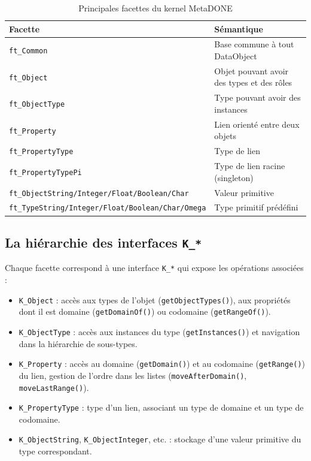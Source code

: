 \begin{table}[h]
\centering
\begin{tabular}{ll}
\hline
\textbf{Facette} & \textbf{Sémantique} \\
\hline
\texttt{ft\_Common} & Base commune à tout DataObject \\
\texttt{ft\_Object} & Objet pouvant avoir des types et des rôles \\
\texttt{ft\_ObjectType} & Type pouvant avoir des instances \\
\texttt{ft\_Property} & Lien orienté entre deux objets \\
\texttt{ft\_PropertyType} & Type de lien \\
\texttt{ft\_PropertyTypePi} & Type de lien racine (singleton) \\
\texttt{ft\_ObjectString/Integer/Float/Boolean/Char} & Valeur primitive \\
\texttt{ft\_TypeString/Integer/Float/Boolean/Char/Omega} & Type primitif prédéfini \\
\hline
\end{tabular}
\caption{Principales facettes du kernel MetaDONE}
\label{tab:facettypes}
\end{table}

\subsection{La hiérarchie des interfaces \texttt{K\_*}}

Chaque facette correspond à une interface \texttt{K\_*} qui expose les
opérations associées :

\begin{itemize}
    \item \texttt{K\_Object} : accès aux types de l'objet
    (\texttt{getObjectTypes()}), aux propriétés dont il est domaine
    (\texttt{getDomainOf()}) ou codomaine (\texttt{getRangeOf()}).
    \item \texttt{K\_ObjectType} : accès aux instances du type
    (\texttt{getInstances()}) et navigation dans la hiérarchie de
    sous-types.
    \item \texttt{K\_Property} : accès au domaine (\texttt{getDomain()})
    et au codomaine (\texttt{getRange()}) du lien, gestion de l'ordre
    dans les listes (\texttt{moveAfterDomain()},
    \texttt{moveLastRange()}).
    \item \texttt{K\_PropertyType} : type d'un lien, associant un type
    de domaine et un type de codomaine.
    \item \texttt{K\_ObjectString}, \texttt{K\_ObjectInteger}, etc. :
    stockage d'une valeur primitive du type correspondant.
\end{itemize}

